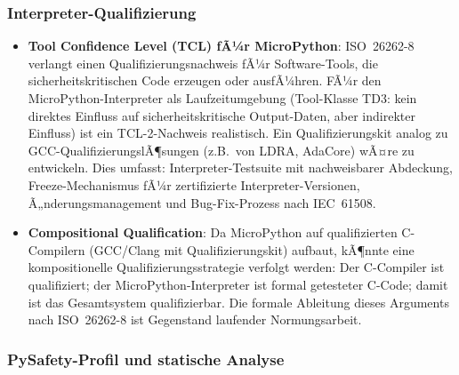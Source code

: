 ﻿\documentclass[12pt,a4paper,twoside]{article}
\begin{document}
\subsubsection{Interpreter-Qualifizierung}

\begin{itemize}
  \item \textbf{Tool Confidence Level (TCL) fÃ¼r MicroPython}:
        ISO~26262-8 verlangt einen Qualifizierungsnachweis fÃ¼r Software-Tools,
        die sicherheitskritischen Code erzeugen oder ausfÃ¼hren.
        FÃ¼r den MicroPython-Interpreter als Laufzeitumgebung
        (Tool-Klasse TD3: kein direktes Einfluss auf sicherheitskritische
        Output-Daten, aber indirekter Einfluss) ist ein TCL-2-Nachweis
        realistisch.
        Ein Qualifizierungskit analog zu GCC-QualifizierungslÃ¶sungen (z.B.\ von
        LDRA, AdaCore) wÃ¤re zu entwickeln.
        Dies umfasst: Interpreter-Testsuite mit nachweisbarer Abdeckung,
        Freeze-Mechanismus fÃ¼r zertifizierte Interpreter-Versionen,
        Ã„nderungsmanagement und Bug-Fix-Prozess nach IEC~61508.

  \item \textbf{Compositional Qualification}:
        Da MicroPython auf qualifizierten C-Compilern (GCC/Clang mit
        Qualifizierungskit) aufbaut, kÃ¶nnte eine kompositionelle
        Qualifizierungsstrategie verfolgt werden: Der C-Compiler ist
        qualifiziert; der MicroPython-Interpreter ist formal
        getesteter C-Code; damit ist das Gesamtsystem qualifizierbar.
        Die formale Ableitung dieses Arguments nach ISO~26262-8 ist
        Gegenstand laufender Normungsarbeit.
\end{itemize}

\subsubsection{PySafety-Profil und statische Analyse}
\end{document}
